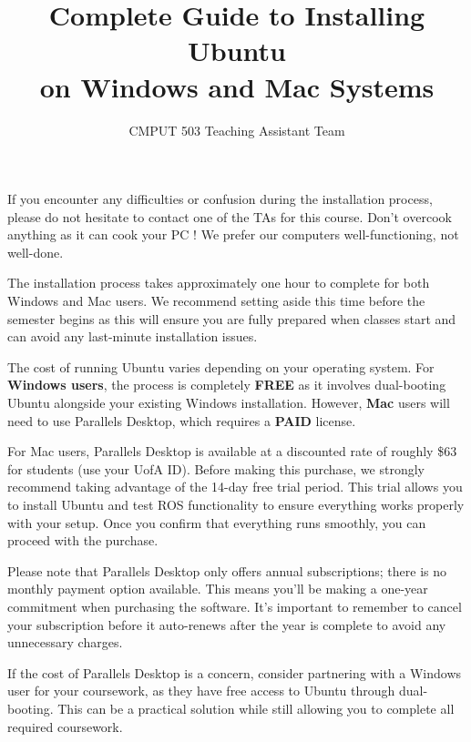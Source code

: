 \documentclass[11pt,a4paper]{article}
\begin{document}
\title{\textbf{Complete Guide to Installing Ubuntu \\
on Windows and Mac Systems}}
\author{CMPUT 503 Teaching Assistant Team}

\maketitle

\tableofcontents
\newpage

\begin{tcolorbox}[colback=yellow!10,colframe=orange!50!black,title=\textbf{Important Disclaimer}]
If you encounter any difficulties or confusion during the installation process, please do not hesitate to contact one of the TAs for this course. Don't overcook anything as it can cook your PC ! We prefer our computers well-functioning, not well-done. 

The installation process takes approximately one hour to complete for both Windows and Mac users. We recommend setting aside this time before the semester begins as this will ensure you are fully prepared when classes start and can avoid any last-minute installation issues.
\end{tcolorbox}

\begin{tcolorbox}[colback=blue!10,colframe=blue!50!black,title=\textbf{Cost Information}]
The cost of running Ubuntu varies depending on your operating system. For \textbf{Windows users}, the process is completely \textbf{FREE} as it involves dual-booting Ubuntu alongside your existing Windows installation. However, \textbf{Mac} users will need to use Parallels Desktop, which requires a \textbf{PAID} license.

For Mac users, Parallels Desktop is available at a discounted rate of roughly \$63 for students (use your UofA ID). Before making this purchase, we strongly recommend taking advantage of the 14-day free trial period. This trial allows you to install Ubuntu and test ROS functionality to ensure everything works properly with your setup. Once you confirm that everything runs smoothly, you can proceed with the purchase.

Please note that Parallels Desktop only offers annual subscriptions; there is no monthly payment option available. This means you'll be making a one-year commitment when purchasing the software. It's important to remember to cancel your subscription before it auto-renews after the year is complete to avoid any unnecessary charges.

If the cost of Parallels Desktop is a concern, consider partnering with a Windows user for your coursework, as they have free access to Ubuntu through dual-booting. This can be a practical solution while still allowing you to complete all required coursework. 
\end{tcolorbox}
\end{document}
